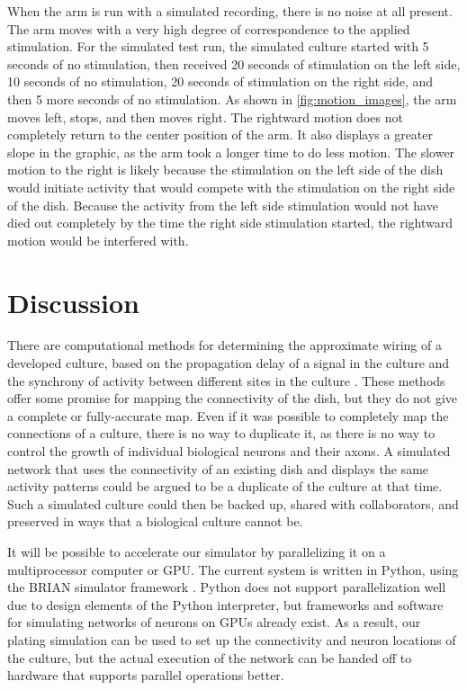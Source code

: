 \documentclass[letterpaper]{article}
\begin{document}
When the arm is run with a simulated recording, there is no noise at all present. 
The arm moves with a very high degree of correspondence to the applied stimulation. 
For the simulated test run, the simulated culture started with 5 seconds of no stimulation, then received 20 seconds of stimulation on the left side, 10 seconds of no stimulation, 20 seconds of stimulation on the right side, and then 5 more seconds of no stimulation. 
As shown in \ref{fig:motion_images}, the arm moves left, stops, and then moves right. 
The rightward motion does not completely return to the center position of the arm. 
It also displays a greater slope in the graphic, as the arm took a longer time to do less motion.
The slower motion to the right is likely because the stimulation on the left side of the dish would initiate activity that would compete with the stimulation on the right side of the dish.
Because the activity from the left side stimulation would not have died out completely by the time the right side stimulation started, the rightward motion would be interfered with. 

\section{Discussion}

There are computational methods for determining the approximate wiring of a developed culture, based on the propagation delay of a signal in the culture and the synchrony of activity between different sites in the culture  \cite{erickson2008caged,esposti2008estimation}. 
These methods offer some promise for mapping the connectivity of the dish, but they do not give a complete or fully-accurate map. 
Even if it was possible to completely map the connections of a culture, there is no way to duplicate it, as there is no way to control the growth of individual biological neurons and their axons. 
A simulated network that uses the connectivity of an existing dish and displays the same activity patterns could be argued to be a duplicate of the culture at that time. 
Such a simulated culture could then be backed up, shared with collaborators, and preserved in ways that a biological culture cannot be. 

It will be possible to accelerate our simulator by parallelizing it on a multiprocessor computer or GPU.
The current system is written in Python, using the BRIAN simulator framework \cite{goodman2008brian}. 
Python does not support parallelization well due to design elements of the Python interpreter, but frameworks and software for simulating networks of neurons on GPUs already exist. 
As a result, our plating simulation can be used to set up the connectivity and neuron locations of the culture, but the actual execution of the network can be handed off to hardware that supports parallel operations better. 
\end{document}
